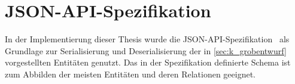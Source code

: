 \section{JSON-API-Spezifikation}
\label{sec:g_json_api_spezifikation}

In der Implementierung dieser Thesis wurde die
JSON-API-Spezifikation~\cite{jsonapi} als Grundlage zur Serialisierung und
Deserialisierung der in \cref{sec:k_grobentwurf} vorgestellten Entitäten
genutzt.  Das in der Spezifikation definierte Schema ist zum Abbilden der
meisten Entitäten und deren Relationen geeignet.



